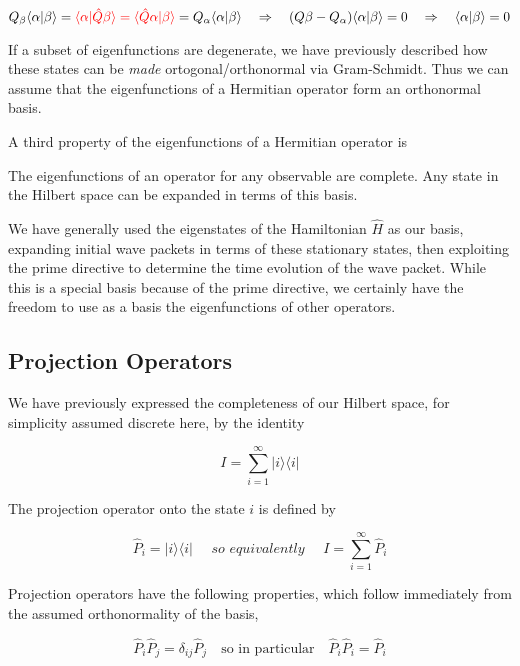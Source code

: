 \[
  Q_\beta \langle \alpha | \beta \rangle = \textcolor{red}{\langle \alpha | \hat{Q} \beta \rangle
  = \langle \hat{Q} \alpha | \beta \rangle} = Q_\alpha \langle \alpha | \beta
\rangle \quad \Rightarrow \quad (Q\beta - Q_\alpha) \langle \alpha | \beta
\rangle  = 0 \quad \Rightarrow \quad \langle \alpha | \beta \rangle  = 0 
\] \vspace{3px}

If a subset of eigenfunctions are degenerate, we have previously described how
these states can be \textit{made} ortogonal/orthonormal via Gram-Schmidt. Thus
we can assume that the eigenfunctions of a Hermitian operator form an
orthonormal basis. 

A third property of the eigenfunctions of a Hermitian operator is 

\begin{mainbox}{}
  The eigenfunctions of an operator for any observable are complete. Any
  state in the Hilbert space can be expanded in terms of this basis.
\end{mainbox}

We have generally used the eigenstates of the Hamiltonian $\hat{H}$ as our
basis, expanding initial wave packets in terms of these stationary states, then
exploiting the prime directive to determine the time evolution of the wave
packet. While this is a special basis because of the prime directive, we
certainly have the freedom to use as a basis the eigenfunctions of other
operators. 


\subsection{Projection Operators} 

We have previously expressed the completeness of our Hilbert space, for
simplicity assumed discrete here, by the identity 

\[
I = \sum_{i=1}^{\infty} |i\rangle \langle i | 
\] \vspace{3px}

The projection operator onto the state $i$ is defined by 

\[
\hat{P}_i = |i\rangle \langle i | \quad \textit{ so equivalently } \quad
I = \sum_{i=1}^{\infty} \hat{P}_i 
\] \vspace{3px}

Projection operators have the following properties, which follow immediately
from the assumed orthonormality of the basis, 

\[
  \hat{P}_i \hat{P}_j = \delta_{ij} \hat{P}_j \quad \text{so in particular}
  \quad \hat{P}_i \hat{P}_i = \hat{P}_i
\] \vspace{3px}


